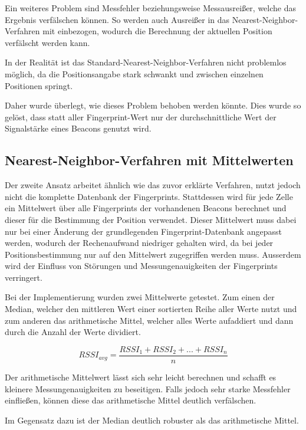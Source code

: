 Ein weiteres Problem sind Messfehler beziehungsweise Messausreißer, welche das Ergebnis verfälschen können. So werden auch Ausreißer in das Nearest-Neighbor-Verfahren mit einbezogen, wodurch die Berechnung der aktuellen Position verfälscht werden kann.

In der Realität ist das Standard-Nearest-Neighbor-Verfahren nicht problemlos möglich, da die Positionsangabe stark schwankt und zwischen einzelnen Positionen springt.

Daher wurde überlegt, wie dieses Problem behoben werden könnte. Dies wurde so gelöst, dass statt aller Fingerprint-Wert nur der durchschnittliche Wert der Signalstärke eines Beacons genutzt wird.


\subsection{Nearest-Neighbor-Verfahren mit Mittelwerten}
\label{sec:implementation:fingerprinting:positioning:avg}
Der zweite Ansatz arbeitet ähnlich wie das zuvor erklärte Verfahren, nutzt jedoch nicht die komplette Datenbank der Fingerprints. 
Stattdessen wird für jede Zelle ein Mittelwert über alle Fingerprints der vorhandenen Beacons berechnet und dieser für die Bestimmung der Position verwendet.
Dieser Mittelwert muss dabei nur bei einer Änderung der grundlegenden Fingerprint-Datenbank angepasst werden, wodurch der Rechenaufwand niedriger gehalten wird, da bei jeder Positionsbestimmung nur auf den Mittelwert zugegriffen werden muss.
Ausserdem wird der Einfluss von Störungen und Messungenauigkeiten der Fingerprints verringert.

Bei der Implementierung wurden zwei Mittelwerte getestet. Zum einen der Median, welcher den mittleren Wert einer sortierten Reihe aller Werte nutzt und zum anderen das arithmetische Mittel, welcher alles Werte aufaddiert und dann durch die Anzahl der Werte dividiert.

\begin{equation}
	RSSI_{avg} = \frac{RSSI_{1} + RSSI_{2} + ... + RSSI_{n}}{n}
\end{equation}

Der arithmetische Mittelwert lässt sich sehr leicht berechnen und schafft es kleinere Messungenauigkeiten zu beseitigen. Falls jedoch sehr starke Messfehler einfließen, können diese das arithmetische Mittel deutlich verfälschen.

Im Gegensatz dazu ist der Median deutlich robuster als das arithmetische Mittel.

